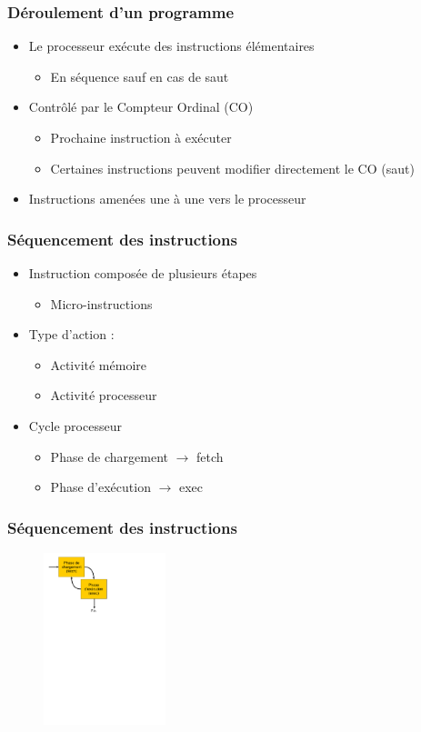 \begin{frame}
\frametitle{Déroulement d'un programme}
\begin{itemize}
\item Le processeur exécute des instructions élémentaires
\begin{itemize}
\item En séquence sauf en cas de saut
\end{itemize}
\item Contrôlé par le Compteur Ordinal (CO)
\begin{itemize}
\item Prochaine instruction à exécuter
\item Certaines instructions peuvent modifier directement le CO (saut)
\end{itemize}
\item Instructions amenées une à une vers le processeur
\end{itemize}
\end{frame}


\begin{frame}
\frametitle{Séquencement des instructions}
\begin{itemize}
\item Instruction composée de plusieurs étapes
\begin{itemize}
\item Micro-instructions
\end{itemize}
\item Type d'action :
\begin{itemize}
\item Activité mémoire
\item Activité processeur
\end{itemize}
\item Cycle processeur
\begin{itemize}
\item Phase de chargement $\rightarrow$ fetch
\item Phase d'exécution $\rightarrow$ exec
\end{itemize}
\end{itemize}
\end{frame}


\begin{frame}
\frametitle{Séquencement des instructions}
\begin{figure}[htbp]
\includegraphics[height=5cm]{../illustration/phases_exec.pdf}
\end{figure}
\end{frame}


